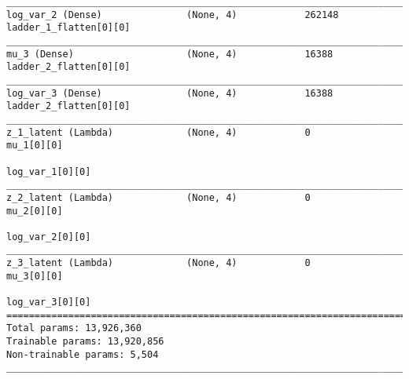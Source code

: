 \begin{lstlisting}[caption={dSprites-VLAE-GAN Encoder},captionpos=b,basicstyle=\tiny, label={lst:mnist-vlae-gan-encoder}]
__________________________________________________________________________________________________
log_var_2 (Dense)               (None, 4)            262148      ladder_1_flatten[0][0]
__________________________________________________________________________________________________
mu_3 (Dense)                    (None, 4)            16388       ladder_2_flatten[0][0]
__________________________________________________________________________________________________
log_var_3 (Dense)               (None, 4)            16388       ladder_2_flatten[0][0]
__________________________________________________________________________________________________
z_1_latent (Lambda)             (None, 4)            0           mu_1[0][0]
                                                                 log_var_1[0][0]
__________________________________________________________________________________________________
z_2_latent (Lambda)             (None, 4)            0           mu_2[0][0]
                                                                 log_var_2[0][0]
__________________________________________________________________________________________________
z_3_latent (Lambda)             (None, 4)            0           mu_3[0][0]
                                                                 log_var_3[0][0]
==================================================================================================
Total params: 13,926,360
Trainable params: 13,920,856
Non-trainable params: 5,504
__________________________________________________________________________________________________
\end{lstlisting}